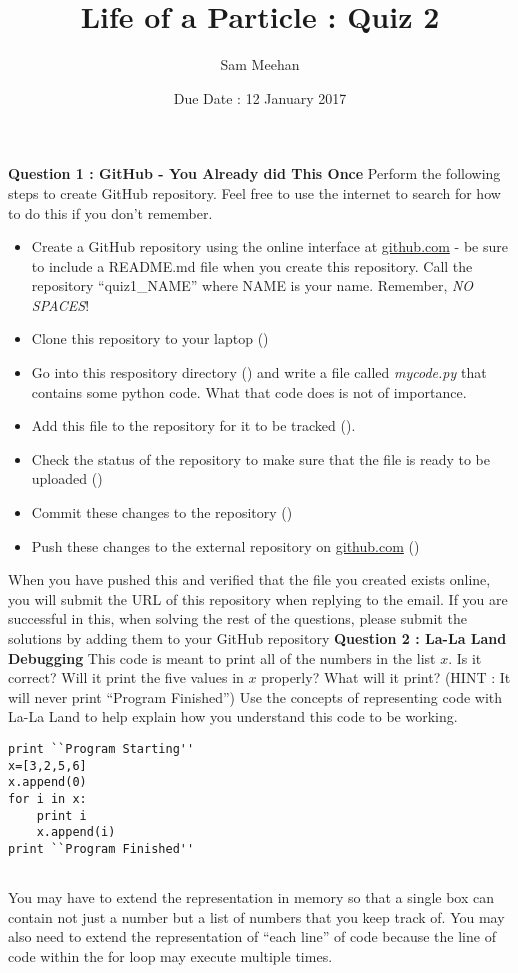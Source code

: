 \documentclass[12pt]{article}
\title{Life of a Particle : Quiz 2}
\author{Sam Meehan}
\date{Due Date : 12 January 2017}
\begin{document}
\maketitle

\textbf{Question 1 : GitHub - You Already did This Once}
Perform the following steps to create GitHub repository.  Feel free to use the internet to search for how to do this if you don't remember.
\begin{itemize}[noitemsep]
\item Create a GitHub repository using the online interface at \href{https://github.com}{github.com} - be sure to include a README.md file when you create this repository.  Call the repository ``quiz1\_NAME'' where NAME is your name.  Remember, \textit{NO SPACES}!
\item Clone this repository to your laptop (\small{})
\item Go into this respository directory (\small{}) and write a file called \textit{mycode.py} that contains some python code.  What that code does is not of importance.
\item Add this file to the repository for it to be tracked (\small{}).
\item Check the status of the repository to make sure that the file is ready to be uploaded (\small{})
\item Commit these changes to the repository (\small{})
\item Push these changes to the external repository on \href{https://github.com}{github.com} (\small{})
\end{itemize}
When you have pushed this and verified that the file you created exists online, you will submit the URL of this repository when replying to the email.  If you are successful in this, when solving the rest of the questions, please submit the solutions by adding them to your GitHub repository 
\newline
\newline
\textbf{Question 2 : La-La Land Debugging}
This code is meant to print all of the numbers in the list $x$.  Is it correct?  Will it print the five values in $x$ properly?  What will it print? (HINT : It will never print ``Program Finished'')  Use the concepts of representing code with La-La Land to help explain how you understand this code to be working.
\begin{lstlisting}
print ``Program Starting''
x=[3,2,5,6]
x.append(0)
for i in x:
    print i
    x.append(i)
print ``Program Finished''


\end{lstlisting}
You may have to extend the representation in memory so that a single box can contain not just a number but a list of numbers that you keep track of.  You may also need to extend the representation of ``each line'' of code because the line of code within the for loop may execute multiple times.
\end{document}
